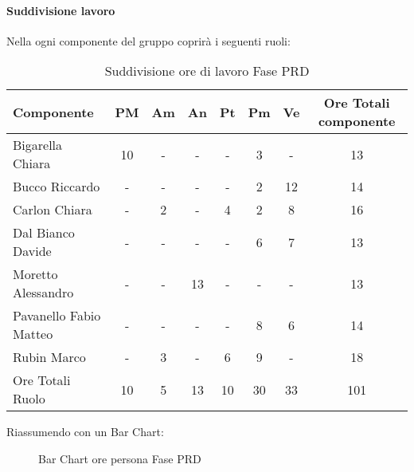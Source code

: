 			\paragraph{Suddivisione lavoro}
				Nella  ogni componente del gruppo \groupname{} coprirà i seguenti ruoli:
				\begin{table}
					\begin{center}
						\begin{tabular}{| l | c | c | c | c | c | c | c |}
							\hline
							Componente 					& PM		& Am	 	& An 		& Pt 		& Pm 		& Ve 		& Ore Totali componente \\ \hline
							
							Bigarella Chiara 			& 10 		& - 		& - 		& - 		& 3 		& - 		& 13 \\
							Bucco Riccardo 				& - 		& - 		& - 		& - 		& 2			& 12 		& 14 \\
							Carlon Chiara	 			& - 		& 2 		& - 		& 4 		& 2 		& 8 		& 16 \\
							Dal Bianco Davide 			& - 		& - 		& - 		& - 		& 6 		& 7 		& 13 \\
							Moretto Alessandro 			& - 		& - 		& 13 		& - 		& - 		& - 		& 13 \\
							Pavanello Fabio Matteo	 	& - 		& - 		& - 		& - 		& 8 		& 6 		& 14 \\
							Rubin Marco					& - 		& 3 		& - 		& 6 		& 9 		& - 		& 18 \\ \hline \hline
							
							Ore Totali Ruolo 			& 10 		& 5 		& 13 		& 10 		& 30 		& 33 		& 101\\ \hline
						\end{tabular}
					\end{center}
					\caption{Suddivisione ore di lavoro Fase PRD}
				\end{table}
				Riassumendo con un Bar Chart:
				\begin{figure}\centering
					\caption{Bar Chart ore persona Fase PRD}
				\end{figure}
